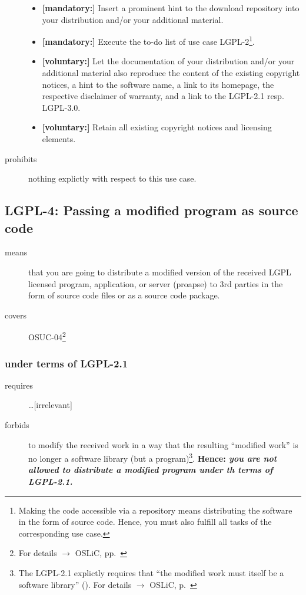 \begin{description}
\begin{itemize}
  \item \textbf{[mandatory:]} Insert a prominent hint to the download repository
  into your distribution and/or your additional material.
  
  \item \textbf{[mandatory:]} Execute the to-do list of use case LGPL-2\footnote{
  Making the code accessible via a repository means distributing the software in
  the form of source code. Hence, you must also fulfill all tasks of the
  corresponding use case.}.
   
  \item \textbf{[voluntary:]} Let the documentation of your distribution and/or
  your additional material also reproduce the content of the existing
  copyright notices, a hint to the software name, a link to its homepage,
  the respective disclaimer of warranty, and a link to the LGPL-2.1 resp.
  LGPL-3.0.
  
  \item \textbf{[voluntary:]} Retain all existing copyright notices and
  licensing elements.

\end{itemize}

\item[prohibits] nothing explictly with respect to this use case.

\end{description}

\subsection{LGPL-4: Passing a modified program as source code}
\label{OSUC-04-LGPL} 

\begin{description}
\item[means] that you are going to distribute a modified version of the received
LGPL licensed program, application, or server (proapse) to 3rd parties in the
form of source code files or as a source code package.
\item[covers] OSUC-04\footnote{For details $\rightarrow$ OSLiC, pp.\ \pageref{OSUC-04-DEF}}
\end{description}

\subsubsection{under terms of LGPL-2.1}

\begin{description}
  \item[requires] \ldots [irrelevant] 
  \item[forbids] to modify the received work in a way that the resulting
  \enquote{modified work} is no longer a software library (but a
  program)\footnote{The LGPL-2.1 explictly requires that \enquote{the modified
  work must itself be a software library} (\cite[cf.][\nopage wp.\
  §2a]{Lgpl21OsiLicense1999a}). For details $\rightarrow$ OSLiC, p.\
  \pageref{para:libislib}}. \textbf{Hence: \emph{you are not allowed to
  distribute a modified program under th terms of LGPL-2.1.}}
\end{description}

